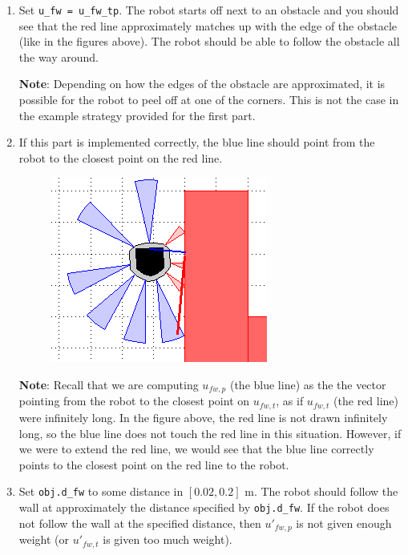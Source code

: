 \documentclass[10pt]{article}
\begin{document}
\begin{enumerate}
	\item Set \texttt{u\_fw = u\_fw\_tp}. The robot starts off next to an obstacle and you should see that the red line approximately matches up with the edge of the obstacle (like in the figures above). The robot should be able to follow the obstacle all the way around.
	
	\textbf{Note}: Depending on how the edges of the obstacle are approximated, it is possible for the robot to peel off at one of the corners. This is not the case in the example strategy provided for the first part.
	
	\item If this part is implemented correctly, the blue line should point from the robot to the closest point on the red line.
	
	\begin{figure}[h]
		\centering
		\includegraphics[scale=0.5]{week-6-part-2.png}
		\label{fig:week6part2}
	\end{figure}
	
	\textbf{Note}: Recall that we are computing $u_{fw,p}$ (the blue line) as the the vector pointing from the robot to the closest point on $u_{fw,t}$, as if $u_{fw,t}$ (the red line) were infinitely long. In the figure above, the red line is not drawn infinitely long, so the blue line does not touch the red line in this situation. However, if we were to extend the red line, we would see that the blue line correctly points to the closest point on the red line to the robot.
	
	\item Set \texttt{obj.d\_fw} to some distance in $[0.02,0.2]$ m. The robot should follow the wall at approximately the distance specified by \texttt{obj.d\_fw}. If the robot does not follow the wall at the specified distance, then $u'_{fw,p}$ is not given enough weight (or $u'_{fw,t}$ is given too much weight).
	
\end{enumerate}
\end{document}
